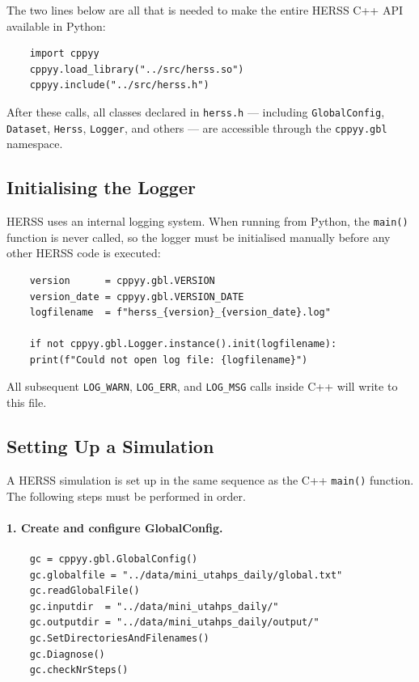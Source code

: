 \documentclass[a4paper, 12pt]{report}
\begin{document}
	The two lines below are all that is needed to make the entire HERSS C++ API
	available in Python:

	\begin{verbatim}
	import cppyy
	cppyy.load_library("../src/herss.so")
	cppyy.include("../src/herss.h")
	\end{verbatim}

	After these calls, all classes declared in \texttt{herss.h} --- including
	\texttt{GlobalConfig}, \texttt{Dataset}, \texttt{Herss}, \texttt{Logger}, and
	others --- are accessible through the \texttt{cppyy.gbl} namespace.

	\subsection{Initialising the Logger}

	HERSS uses an internal logging system. When running from Python, the
	\texttt{main()} function is never called, so the logger must be initialised
	manually before any other HERSS code is executed:

	\begin{verbatim}
	version      = cppyy.gbl.VERSION
	version_date = cppyy.gbl.VERSION_DATE
	logfilename  = f"herss_{version}_{version_date}.log"
	
	if not cppyy.gbl.Logger.instance().init(logfilename):
	print(f"Could not open log file: {logfilename}")
	\end{verbatim}

	\noindent All subsequent \texttt{LOG\_WARN}, \texttt{LOG\_ERR}, and
	\texttt{LOG\_MSG} calls inside C++ will write to this file.

	\subsection{Setting Up a Simulation}

	A HERSS simulation is set up in the same sequence as the C++ \texttt{main()}
	function. The following steps must be performed in order.

	\paragraph{1. Create and configure GlobalConfig.}
	\begin{verbatim}
	gc = cppyy.gbl.GlobalConfig()
	gc.globalfile = "../data/mini_utahps_daily/global.txt"
	gc.readGlobalFile()
	gc.inputdir  = "../data/mini_utahps_daily/"
	gc.outputdir = "../data/mini_utahps_daily/output/"
	gc.SetDirectoriesAndFilenames()
	gc.Diagnose()
	gc.checkNrSteps()
	\end{verbatim}
\end{document}
